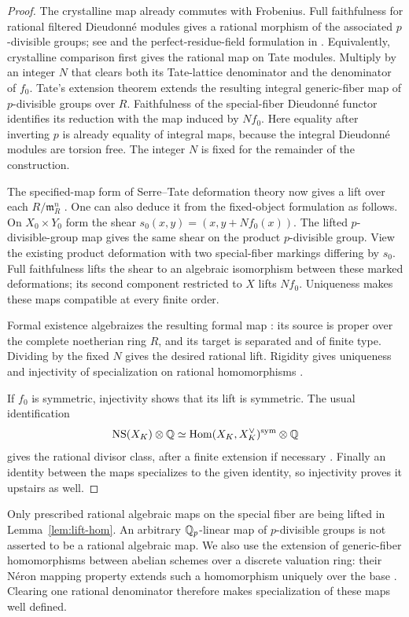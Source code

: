 \begin{proof}
The crystalline map already commutes with Frobenius. Full faithfulness
for rational filtered Dieudonn\'e modules gives a rational morphism of
the associated \(p\)-divisible groups; see
\cite{Grothendieck1970} and the perfect-residue-field formulation in
\cite[\S4.2(v)]{IllusiePisa}. Equivalently, crystalline comparison first
gives the rational map on Tate modules. Multiply by an integer \(N\)
that clears both its Tate-lattice denominator and the denominator of
\(f_0\). Tate's extension theorem
\cite[Theorem~4]{Tate1967} extends the resulting integral generic-fiber
map of \(p\)-divisible groups over \(R\). Faithfulness of the
special-fiber Dieudonn\'e functor identifies its reduction with the
map induced by \(Nf_0\). Here equality after inverting \(p\) is
already equality of integral maps, because the integral Dieudonn\'e
modules are torsion free. The integer \(N\) is fixed for the remainder
of the construction.

The specified-map form of Serre--Tate deformation theory now gives a
lift over each \(R/\mathfrak m_R^n\)
\cite[p.~432]{Grothendieck1970}. One can also deduce it from the
fixed-object formulation \cite[Theorem~2.3.3]{IllusiePisa} as follows.
On \(X_0\times Y_0\) form the shear
\(s_0(x,y)=(x,y+Nf_0(x))\). The lifted \(p\)-divisible-group map gives
the same shear on the product \(p\)-divisible group. View the existing
product deformation with two special-fiber markings differing by
\(s_0\). Full faithfulness lifts the shear to an algebraic isomorphism
between these marked deformations; its second component restricted to
\(X\) lifts \(Nf_0\). Uniqueness makes these maps compatible at every
finite order.

Formal existence algebraizes the resulting formal map
\cite[Tag~0A42]{StacksProject}: its source is proper over the complete
noetherian ring \(R\), and its target is separated and of finite type.
Dividing by the fixed \(N\) gives the desired rational lift. Rigidity
gives uniqueness and injectivity of specialization on rational
homomorphisms \cite[Proposition~20.1 and Corollary~20.2]{MilneAV}.

If \(f_0\) is symmetric, injectivity shows that its lift is symmetric.
The usual identification
\[
 \operatorname{NS}(X_K)\otimes\mathbb Q
   \simeq\operatorname{Hom}(X_K,X_K^\vee)^{\mathrm{sym}}\otimes\mathbb Q
\]
gives the rational divisor class, after a finite extension if
necessary \cite[Proposition~17.2]{MilneAV}. Finally an identity between the maps specializes to the
given identity, so injectivity proves it upstairs as well.
\end{proof}

Only prescribed rational algebraic maps on the special fiber are being
lifted in Lemma~\ref{lem:lift-hom}. An arbitrary \(\mathbb Q_p\)-linear map of
\(p\)-divisible groups is not asserted to be a rational algebraic map.
We also use the extension of generic-fiber homomorphisms between abelian
schemes over a discrete valuation ring: their N\'eron mapping property
extends such a homomorphism uniquely over the base
\cite[Definition~5.1 and Example~5.3]{Conrad2003}. Clearing one
rational denominator therefore makes specialization of these maps
well defined.
